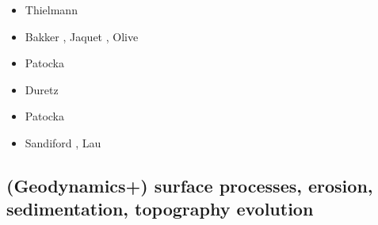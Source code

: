 \begin{scriptsize}
\begin{itemize}
\item[\twothousandfifteen] Thielmann \etal \cite{thkp15}
\item[\twothousandsixteen] Bakker \etal \cite{bafl16}, Jaquet \etal \cite{jads16},
                           Olive \etal \cite{olbm16}
\item[\twothousandseventeen] Patocka \cite{pact17}
\item[\twothousandeighteen] Duretz \etal \cite{dusd18}
\item[\twothousandnineteen] Patocka \etal \cite{pact19}
\item[\twothousandtwenty] Sandiford \etal \cite{sams20}, Lau \etal \cite{lahh20}
\end{itemize}
\end{scriptsize}

\subsection{(Geodynamics+) surface processes, erosion, sedimentation, topography evolution}

